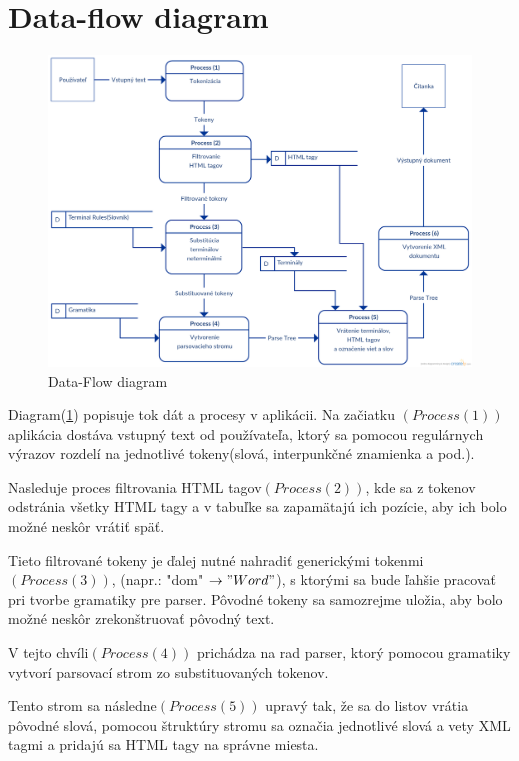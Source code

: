 \documentclass[12pt,a4paper]{report}
\theoremstyle{definition}
\theoremstyle{remark}
\begin{document}
\section{Data-flow diagram}
\begin{figure}[h]
\centering
\setlength{\belowcaptionskip}{-4pt}
\includegraphics[scale=0.21]{DFD}
\caption{Data-Flow diagram}
  \label{fig:dataflow}
\end{figure}

Diagram(\ref{fig:dataflow}) popisuje tok dát a procesy v aplikácii. Na začiatku $(Process (1))$ aplikácia dostáva vstupný text od používateľa, ktorý sa pomocou regulárnych výrazov rozdelí na jednotlivé tokeny(slová, interpunkčné znamienka a pod.).

 Nasleduje proces filtrovania HTML tagov$(Process (2))$, kde sa z tokenov odstránia všetky HTML tagy a v tabuľke sa zapamätajú ich pozície, aby ich bolo možné neskôr vrátiť späť. 
 
Tieto filtrované tokeny je ďalej nutné nahradiť generickými tokenmi$(Process (3))$, (napr.: "dom" $\to  "Word"$), s ktorými sa bude ľahšie pracovať pri tvorbe gramatiky pre parser. Pôvodné tokeny sa samozrejme uložia, aby bolo možné neskôr zrekonštruovať pôvodný text. 

V tejto chvíli$(Process(4))$ prichádza na rad parser, ktorý pomocou gramatiky vytvorí parsovací strom zo substituovaných tokenov. 

Tento strom sa následne$(Process (5))$ upravý tak, že sa do listov vrátia pôvodné slová, pomocou štruktúry stromu sa označia jednotlivé slová a vety XML tagmi a pridajú sa HTML tagy na správne miesta. 
\end{document}
